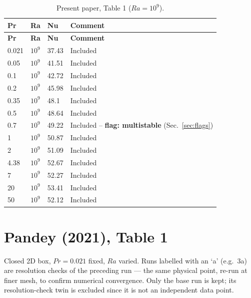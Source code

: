 \documentclass[11pt]{article}
\begin{document}
\begin{longtable}{l l l l}
\caption{Present paper, Table 1 ($Ra=10^9$).}\label{tab:present}\\
\toprule
\textbf{Pr} & \textbf{Ra} & \textbf{Nu} & \textbf{Comment} \\
\midrule
\endfirsthead
\toprule
\textbf{Pr} & \textbf{Ra} & \textbf{Nu} & \textbf{Comment} \\
\midrule
\endhead
\bottomrule
\endfoot
\rowcolor{included} 0.021 & $10^{9}$ & 37.43 & Included \\
\rowcolor{included} 0.05 & $10^{9}$ & 41.51 & Included \\
\rowcolor{included} 0.1 & $10^{9}$ & 42.72 & Included \\
\rowcolor{included} 0.2 & $10^{9}$ & 45.98 & Included \\
\rowcolor{included} 0.35 & $10^{9}$ & 48.1 & Included \\
\rowcolor{included} 0.5 & $10^{9}$ & 48.64 & Included \\
\rowcolor{included} 0.7 & $10^{9}$ & 49.22 & Included -- \textbf{flag: multistable} (Sec.~\ref{sec:flags}) \\
\rowcolor{included} 1 & $10^{9}$ & 50.87 & Included \\
\rowcolor{included} 2 & $10^{9}$ & 51.09 & Included \\
\rowcolor{included} 4.38 & $10^{9}$ & 52.67 & Included \\
\rowcolor{included} 7 & $10^{9}$ & 52.27 & Included \\
\rowcolor{included} 20 & $10^{9}$ & 53.41 & Included \\
\rowcolor{included} 50 & $10^{9}$ & 52.12 & Included \\
\end{longtable}
\section{Pandey (2021), Table 1}
Closed 2D box, $Pr=0.021$ fixed, $Ra$ varied. Runs labelled with an
`a' (e.g.\ 3a) are resolution checks of the preceding run --- the same
physical point, re-run at finer mesh, to confirm numerical convergence.
Only the base run is kept; its resolution-check twin is excluded since it
is not an independent data point.
\end{document}
